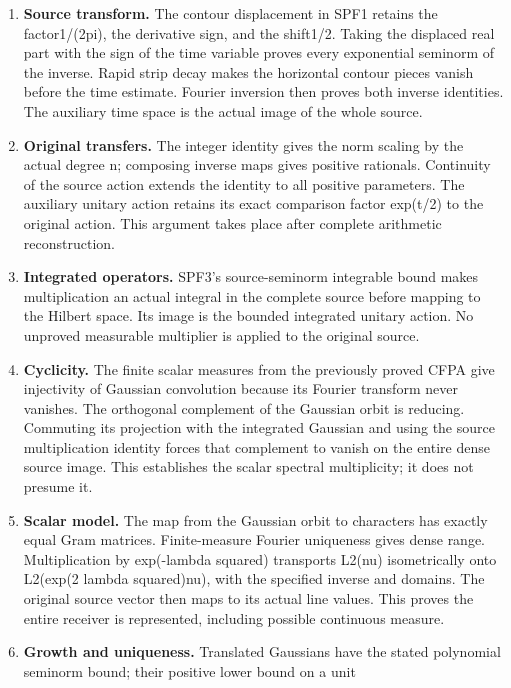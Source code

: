 \begin{enumerate}
\def\labelenumi{\arabic{enumi}.}
\item
  \textbf{Source transform.} The contour displacement in SPF1 retains
  the factor1/(2pi), the derivative sign, and the shift1/2. Taking the
  displaced real part with the sign of the time variable proves every
  exponential seminorm of the inverse. Rapid strip decay makes the
  horizontal contour pieces vanish before the time estimate. Fourier
  inversion then proves both inverse identities. The auxiliary time
  space is the actual image of the whole source.
\item
  \textbf{Original transfers.} The integer identity gives the norm
  scaling by the actual degree n; composing inverse maps gives positive
  rationals. Continuity of the source action extends the identity to all
  positive parameters. The auxiliary unitary action retains its exact
  comparison factor exp(t/2) to the original action. This argument takes
  place after complete arithmetic reconstruction.
\item
  \textbf{Integrated operators.} SPF3's source-seminorm integrable bound
  makes multiplication an actual integral in the complete source before
  mapping to the Hilbert space. Its image is the bounded integrated
  unitary action. No unproved measurable multiplier is applied to the
  original source.
\item
  \textbf{Cyclicity.} The finite scalar measures from the previously
  proved CFPA give injectivity of Gaussian convolution because its
  Fourier transform never vanishes. The orthogonal complement of the
  Gaussian orbit is reducing. Commuting its projection with the
  integrated Gaussian and using the source multiplication identity
  forces that complement to vanish on the entire dense source image.
  This establishes the scalar spectral multiplicity; it does not presume
  it.
\item
  \textbf{Scalar model.} The map from the Gaussian orbit to characters
  has exactly equal Gram matrices. Finite-measure Fourier uniqueness
  gives dense range. Multiplication by exp(-lambda squared) transports
  L2(nu) isometrically onto L2(exp(2 lambda squared)nu), with the
  specified inverse and domains. The original source vector then maps to
  its actual line values. This proves the entire receiver is
  represented, including possible continuous measure.
\item
  \textbf{Growth and uniqueness.} Translated Gaussians have the stated
  polynomial seminorm bound; their positive lower bound on a unit

\end{enumerate}
